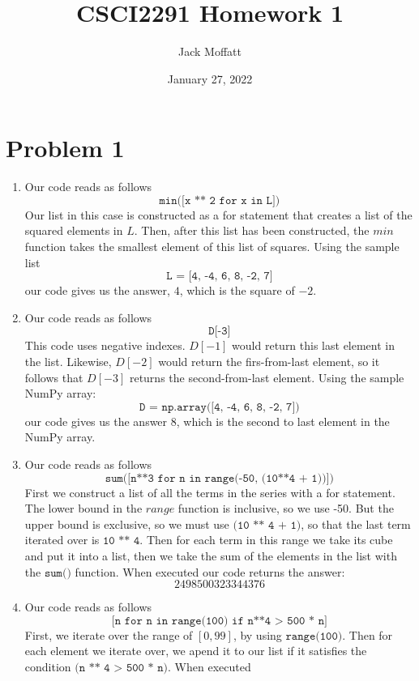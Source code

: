 \documentclass[12pt, letterpaper]{article}
\title{CSCI2291 Homework 1}
\author{Jack Moffatt}
\date{January 27, 2022}
\begin{document}
\maketitle
\noindent\makebox[\linewidth]{\rule{18cm}{0.4pt}}

\section*{Problem 1}
\begin{enumerate}[label=(\alph*)]
    \item Our code reads as follows 
    \[
    \texttt{min([x ** 2 for x in L])}
    \]
    Our list in this case is constructed as a for statement that creates a list of the squared 
    elements in $L$. Then, after this list has been constructed, the $min$ function takes 
    the smallest element of this list of squares. Using the sample list 
    \[
        \texttt{L = [4, -4, 6, 8, -2, 7]}
    \]  
    our code gives us the answer, $4$, which is the square of $-2$.
    \item Our code reads as follows 
    \[ 
    \texttt{D[-3]}
    \]
    This code uses negative indexes. $D[-1]$ would return this last element in the list. 
    Likewise, $D[-2]$ would return the firs-from-last element, so it follows that 
    $D[-3]$ returns the second-from-last element. Using the sample NumPy array:
    \[
        \texttt{D = np.array([4, -4, 6, 8, -2, 7])}
    \]  
    our code gives us the answer $8$, which is the second to last element in the NumPy array.
    \item Our code reads as follows
    \[ 
    \texttt{sum([n**3 for n in range(-50, (10**4 + 1))])}
    \]
    First we construct a list of all the terms in the series with a for statement. The lower bound in the 
    $range$ function is inclusive, so we use -50. But the upper bound is exclusive, so we must use $\texttt{(10 ** 4 + 1)}$, 
    so that the last term iterated over is $\texttt{10 ** 4}$. Then for each term in this range we take its cube and put it into a list, 
    then we take the sum of the elements in the list with the $\texttt{sum()}$ function. 
    When executed our code returns the answer: 
    \[
        2498500323344376 
    \] 
    \item Our code reads as follows
    \[
    \texttt{[n for n in range(100) if n**4 > 500 * n]}
    \]
    First, we iterate over the range of $[0, 99]$, by using $\texttt{range(100)}$. Then for each element 
    we iterate over, we apend it to our list if it satisfies the condition $\texttt{(n ** 4 > 500 * n)}$. When executed 

\end{enumerate}
\end{document}
